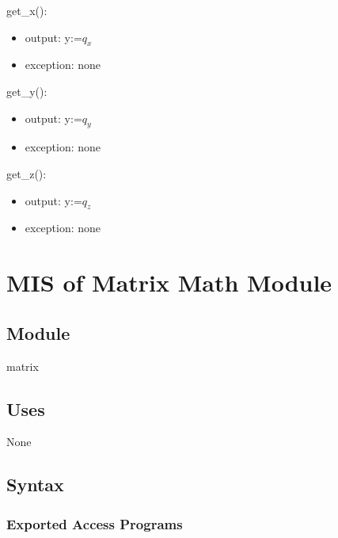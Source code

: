 \documentclass[12pt, titlepage]{article}
\begin{document}
\noindent get\_x():
\begin{itemize}
\item output: y:=$q_x$
\item exception: none
\end{itemize}

\noindent get\_y():
\begin{itemize}
\item output: y:=$q_y$
\item exception: none
\end{itemize}

\noindent get\_z():
\begin{itemize}
\item output: y:=$q_z$
\item exception: none
\end{itemize}

\newpage

\section{MIS of Matrix Math Module} \label{mmm}

\subsection{Module}
matrix

\subsection{Uses}
None

\subsection{Syntax}

\subsubsection{Exported Access Programs}
\end{document}
